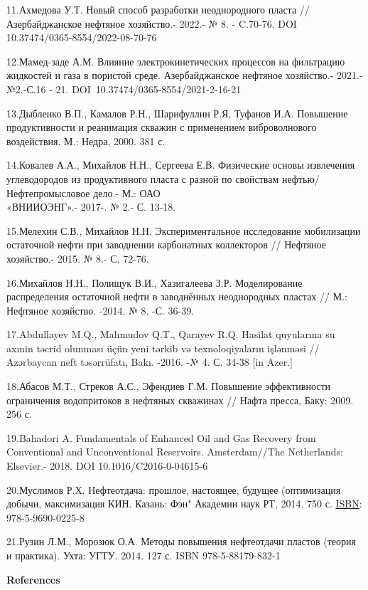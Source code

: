 \begin{references}
11.Ахмедова У.Т. Новый способ разработки неоднородного пласта //
Азербайджанское нефтяное хозяйство.- 2022.- № 8. - C.70-76. DOI
10.37474/0365-8554/2022-08-70-76

12.Мамед-заде А.М. Влияние электрокинетических процессов на фильтрацию
жидкостей и газа в пористой среде. Азербайджанское нефтяное хозяйство.-
2021.-№2.-С.16 - 21. DOI~10.37474/0365-8554/2021-2-16-21

13.Дыбленко В.П., Камалов Р.Н., Шарифуллин Р.Я, Туфанов И.А. Повышение
продуктивности и реанимация скважин с применением виброволнового
воздействия. М.: Недра, 2000. 381 с.

14.Ковалев А.А., Михайлов Н.Н., Сергеева Е.В. Физические основы
извлечения углеводородов из продуктивного пласта с разной по свойствам
нефтью/ Нефтепромысловое дело.- М.: ОАО \\«ВНИИОЭНГ».- 2017-. № 2.- С.
13-18.

15.Мелехин С.В., Михайлов Н.Н. Экспериментальное исследование
мобилизации остаточной нефти при заводнении карбонатных коллекторов //
Нефтяное хозяйство.- 2015. № 8.- С. 72-76.

16.Михайлов Н.Н., Полищук В.И., Хазигалеева З.Р. Моделирование
распределения остаточной нефти в заводнённых неоднородных пластах // М.:
Нефтяное хозяйство. -2014. № 8. -С. 36-39.

17.Abdullayev M.Q., Mahmudov Q.T., Qarayev R.Q. Hasilat quyularına su
axınin təcrid olunması üçün yeni tərkib və texnoloqiyaların işlənməsi //
Azərbaycan neft təsərrüfatı, Bakı. -2016. -№ 4. С. 34-38 {[}in Azer.{]}

18.Абасов М.Т., Стреков А.С., Эфендиев Г.М. Повышение эффективности
ограничения водопритоков в нефтяных скважинах // Нафта пресса, Баку:
2009. 256 с.

19.Bahadori A. Fundamentals of Enhanced Oil and Gas Recovery from
Conventional and Unconventional Reservoirs. Amsterdam//The Netherlands:
Elsevier.- 2018. DOI 10.1016/C2016-0-04615-6

20.Муслимов Р.Х. Нефтеотдача: прошлое, настоящее, будущее (оптимизация
добычи, максимизация КИН. Казань: Фэн" Академии наук РТ, 2014. 750 с.
\href{https://www.libex.ru/qna/ref/isbn/}{ISBN}: 978-5-9690-0225-8

21.Рузин Л.М., Морозюк О.А. Методы повышения нефтеотдачи пластов (теория
и практика). Ухта: УГТУ. 2014. 127 с. ISBN 978-5-88179-832-1
\end{references}

\begin{center}
{\bfseries References}
\end{center}

